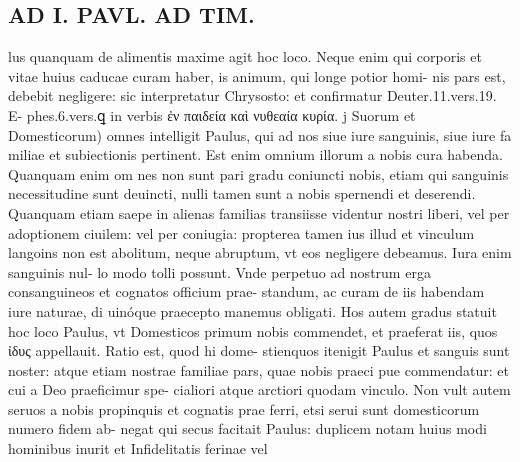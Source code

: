 \documentclass{article}
\begin{document}
\begin{pages}
\section*{AD I. PAVL. AD TIM. }
\marginpar{[ p.266 ]}\pstart lus quanquam de alimentis maxime agit hoc loco. Neque enim qui corporis et vitae huius caducae curam haber, is animum, qui longe potior homi- nis pars est, debebit negligere: sic interpretatur Chrysosto: et confirmatur Deuter.11.vers.19. E- phes.6.vers.ꝗ in verbis ἐν παιδεία καὶ νυθεαία κυρία. j  \pend\pstart Suorum et Domesticorum) omnes intelligit Paulus, qui ad nos siue iure sanguinis, siue iure fa miliae et subiectionis pertinent. Est enim omnium illorum a nobis cura habenda. Quanquam enim om nes non sunt pari gradu coniuncti nobis, etiam qui sanguinis necessitudine sunt deuincti, nulli tamen sunt a nobis spernendi et deserendi. Quanquam etiam saepe in alienas familias transiisse videntur nostri liberi, vel per adoptionem ciuilem: vel per coniugia: propterea tamen ius illud et vinculum langoins non est abolitum, neque abruptum, vt eos negligere debeamus. Iura enim sanguinis nul- lo modo tolli possunt. Vnde perpetuo ad nostrum erga consanguineos et cognatos officium prae- standum, ac curam de iis habendam iure naturae, di uinóque praecepto manemus obligati.  \pend\pstart Hos autem gradus statuit hoc loco Paulus, vt Domesticos primum nobis commendet, et praeferat iis, quos ἰδυς appellauit. Ratio est, quod hi dome- stienquos itenigit Paulus et sanguis sunt noster: atque etiam nostrae familiae pars, quae nobis praeci pue commendatur: et cui a Deo praeficimur spe- cialiori atque arctiori quodam vinculo. Non vult autem seruos a nobis propinquis et cognatis prae ferri, etsi serui sunt domesticorum numero fidem ab- negat qui secus facitait Paulus: duplicem notam huius modi hominibus inurit et Infidelitatis ferinae vel  \pend

\end{pages}
\end{document}
